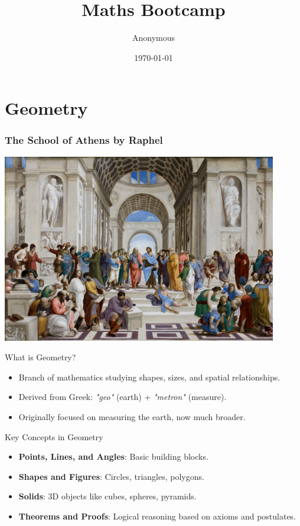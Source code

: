 \documentclass{beamer}
\title{Maths Bootcamp}
\author{Anonymous}
\institute{Overleaf}
\date{\today}
\begin{document}
\frame{\titlepage}

\section{ Geometry}
\begin{frame}
    \frametitle{The School of Athens by Raphel}
    
    \begin{center}
        \includegraphics[width=0.9\textwidth]{the_school_of_athens.jpg} %
    \end{center}
\end{frame}

\begin{frame}{What is Geometry?}
    \begin{itemize}
        \item Branch of mathematics studying shapes, sizes, and spatial relationships.
        \item Derived from Greek: \textit{"geo"} (earth) + \textit{"metron"} (measure).
        \item Originally focused on measuring the earth, now much broader.
    \end{itemize}
\end{frame}

\begin{frame}{Key Concepts in Geometry}
    \begin{itemize}
        \item \textbf{Points, Lines, and Angles}: Basic building blocks.
        \item \textbf{Shapes and Figures}: Circles, triangles, polygons.
        \item \textbf{Solids}: 3D objects like cubes, spheres, pyramids.
        \item \textbf{Theorems and Proofs}: Logical reasoning based on axioms and postulates.
    \end{itemize}
\end{frame}
\end{document}
